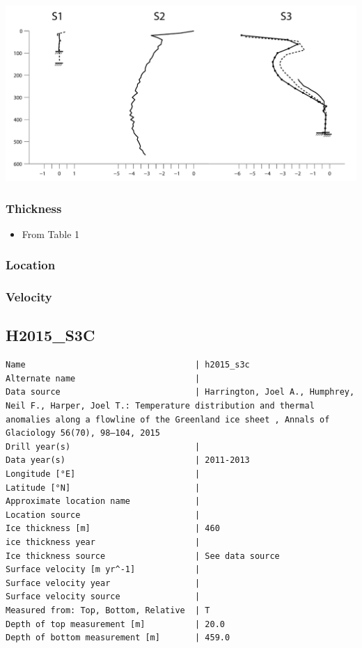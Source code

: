 \documentclass[article,a4paper,times,11pt,twoside]{article}
\begin{document}
\begin{center}
\includegraphics[width=.9\linewidth]{h2015_s3b/harrington_2015_fig2_S1_S2_S3.png}
\end{center}

\subsubsection{Thickness}
\label{sec:org07af998}

\begin{itemize}
\item From \textcite{harrington_2015} Table 1
\end{itemize}

\subsubsection{Location}
\label{sec:org36d2ab5}

\subsubsection{Velocity}
\label{sec:orge909a7e}
\clearpage
\subsection{H2015\_S3C}
\label{sec:orgf067130}
\begin{verbatim}
Name                                  | h2015_s3c
Alternate name                        | 
Data source                           | Harrington, Joel A., Humphrey, Neil F., Harper, Joel T.: Temperature distribution and thermal anomalies along a flowline of the Greenland ice sheet , Annals of Glaciology 56(70), 98–104, 2015 
Drill year(s)                         | 
Data year(s)                          | 2011-2013
Longitude [°E]                        | 
Latitude [°N]                         | 
Approximate location name             | 
Location source                       | 
Ice thickness [m]                     | 460
ice thickness year                    | 
Ice thickness source                  | See data source
Surface velocity [m yr^-1]            | 
Surface velocity year                 | 
Surface velocity source               | 
Measured from: Top, Bottom, Relative  | T
Depth of top measurement [m]          | 20.0
Depth of bottom measurement [m]       | 459.0
\end{verbatim}
\end{document}
